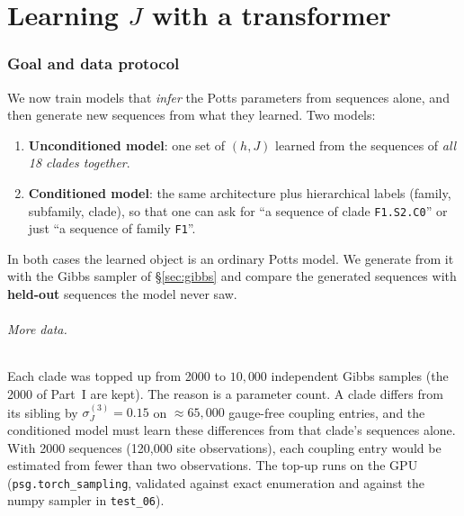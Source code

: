 \part{Learning $J$ with a transformer}

\section{Goal and data protocol}\label{sec:p2goal}
We now train models that \emph{infer} the Potts parameters from sequences alone, and then generate new
sequences from what they learned. Two models:
\begin{enumerate}[nosep]
  \item \textbf{Unconditioned model}: one set of $(h,J)$ learned from the sequences of \emph{all 18 clades together}.
  \item \textbf{Conditioned model}: the same architecture plus hierarchical labels (family, subfamily, clade),
        so that one can ask for ``a sequence of clade \texttt{F1.S2.C0}'' or just ``a sequence of family \texttt{F1}''.
\end{enumerate}
In both cases the learned object is an ordinary Potts model. We generate from it with the Gibbs sampler of
\S\ref{sec:gibbs} and compare the generated sequences with \textbf{held-out} sequences the model never saw.

\paragraph{More data.} Each clade was topped up from 2000 to $10{,}000$ independent Gibbs samples
(the 2000 of Part~I are kept). The reason is a parameter count. A clade differs from its sibling by
$\sigma_J^{(3)}=0.15$ on $\approx65{,}000$ gauge-free coupling entries, and the conditioned model must
learn these differences from that clade's sequences alone. With 2000 sequences (120{,}000 site
observations), each coupling entry would be estimated from fewer than two observations. The top-up
runs on the GPU (\texttt{psg.torch\_sampling}, validated against exact enumeration and against the numpy
sampler in \texttt{test\_06}).

